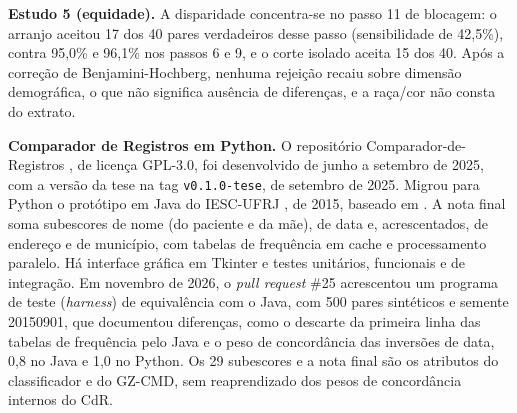 \documentclass[12pt,a4paper]{article}
\makeatletter
\renewcommand\section{\@startsection{section}{1}{\z@}{-1.5ex plus -.5ex}{.8ex}{\normalfont\large\bfseries}}
\makeatother
\begin{document}
\textbf{Estudo 5 (equidade).} A disparidade concentra-se no passo 11 de blocagem: o arranjo aceitou 17 dos 40 pares verdadeiros desse passo (sensibilidade de 42,5\%), contra 95,0\% e 96,1\% nos passos 6 e 9, e o corte isolado aceita 15 dos 40. %
Após a correção de Benjamini-Hochberg, nenhuma rejeição recaiu sobre dimensão demográfica, o que não significa ausência de diferenças, e a raça/cor não consta do extrato. %

\section{Produtos de software}\label{sec:produtos}

\textbf{Comparador de Registros em Python.} O repositório Comparador-de-Registros \cite{Jardim2025comparador}, de licença GPL-3.0, foi desenvolvido de junho a setembro de 2025, com a versão da tese na tag \texttt{v0.1.0-tese}, de setembro de 2025. Migrou para Python o protótipo em Java do IESC-UFRJ \cite{Pecanha2015comparador}, de 2015, baseado em . %
A nota final soma subescores de nome (do paciente e da mãe), de data e, acrescentados, de endereço e de município, com tabelas de frequência em cache e processamento paralelo. Há interface gráfica em Tkinter e testes unitários, funcionais e de integração. %
Em novembro de 2026, o \textit{pull request} \#25 acrescentou um programa de teste (\textit{harness}) de equivalência com o Java, com 500 pares sintéticos e semente 20150901, que documentou diferenças, como o descarte da primeira linha das tabelas de frequência pelo Java e o peso de concordância das inversões de data, 0,8 no Java e 1,0 no Python. %
Os 29 subescores e a nota final são os atributos do classificador e do GZ-CMD, sem reaprendizado dos pesos de concordância internos do CdR. %
\end{document}
